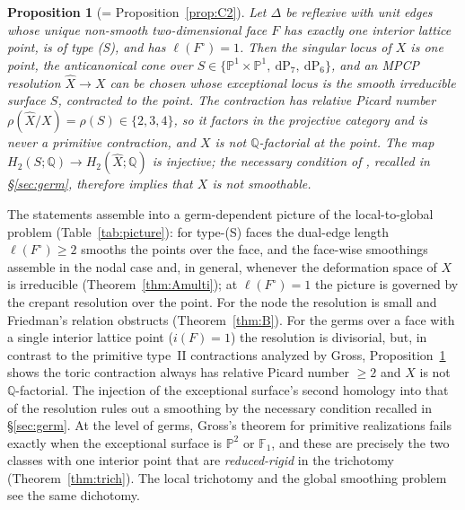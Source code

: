\documentclass[11pt]{amsart}
\newtheorem{proposition}[theorem]{Proposition}
\theoremstyle{definition}
\theoremstyle{remark}
\newcommand{\PP}{\mathbb{P}}
\newcommand{\FF}{\mathbb{F}}
\begin{document}
\begin{proposition}[= Proposition~\ref{prop:C2}]\label{prop:C}
Let $\Delta$ be reflexive with unit edges whose unique non-smooth
two-dimensional face $F$ has exactly one interior lattice point, is of
type \textup{(S)}, and has $\ell(F^\circ) = 1$.  Then the singular locus
of $X$ is one point, the anticanonical cone over $S \in
\{\PP^1{\times}\PP^1,\ \mathrm{dP}_7,\ \mathrm{dP}_6\}$, and an MPCP
resolution $\widehat X \to X$ can be chosen whose exceptional locus is
the smooth irreducible surface $S$, contracted to the point.  The
contraction has relative Picard number
$\rho(\widehat X/X) = \rho(S) \in \{2,3,4\}$, so it factors in the projective category and
is \emph{never} a primitive contraction, and $X$ is not
$\mathbb{Q}$-factorial at the point.  The map
$H_2(S;\mathbb Q)\to H_2(\widehat X;\mathbb Q)$ is injective;
the necessary condition of \cite[Thm.~A]{paper5}, recalled in
\S\ref{sec:germ}, therefore implies that $X$ is not smoothable.
\end{proposition}

The statements assemble into a germ-dependent picture of the
local-to-global problem
(Table~\ref{tab:picture}): for type-(S) faces the dual-edge length
$\ell(F^\circ) \ge 2$ smooths the points over the face, and the
face-wise smoothings assemble in the
nodal case and, in general, whenever the deformation space of $X$ is
irreducible (Theorem~\ref{thm:Amulti}); at $\ell(F^\circ) = 1$ the
picture is governed by the crepant resolution over the point.  For the
node the resolution is small and Friedman's relation obstructs
(Theorem~\ref{thm:B}).  For the germs over a face with a single interior
lattice point ($i(F)=1$) the resolution is
divisorial, but, in contrast to the primitive type~II contractions
analyzed by Gross, Proposition~\ref{prop:C} shows the toric
contraction always has relative Picard number $\ge 2$ and $X$ is not
$\mathbb{Q}$-factorial.  The injection of the exceptional surface's
second homology into that of the resolution rules out a smoothing by
the necessary condition recalled in \S\ref{sec:germ}.  At the level of
germs, Gross's
theorem for primitive realizations fails exactly when the exceptional
surface is $\PP^2$ or $\FF_1$, and these are precisely the two classes with one
interior point that are \emph{reduced-rigid} in the trichotomy
(Theorem~\ref{thm:trich}).
The local trichotomy and the global smoothing problem see the same
dichotomy.
\end{document}
